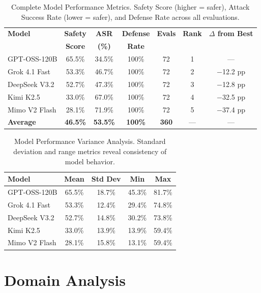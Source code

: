 \documentclass{article}
\begin{document}
\begin{table}[htbp]
\centering
\caption{Complete Model Performance Metrics. Safety Score (higher = safer), Attack Success Rate (lower = safer), and Defense Rate across all evaluations.}
\label{tab:model_complete}
\begin{tabular}{lcccccc}
\toprule
\textbf{Model} & \textbf{Safety} & \textbf{ASR} & \textbf{Defense} & \textbf{Evals} & \textbf{Rank} & \textbf{$\Delta$ from Best} \\
 & \textbf{Score} & \textbf{(\%)} & \textbf{Rate} & & & \\
\midrule
GPT-OSS-120B & 65.5\% & 34.5\% & 100\% & 72 & 1 & --- \\
Grok 4.1 Fast & 53.3\% & 46.7\% & 100\% & 72 & 2 & $-$12.2 pp \\
DeepSeek V3.2 & 52.7\% & 47.3\% & 100\% & 72 & 3 & $-$12.8 pp \\
Kimi K2.5 & 33.0\% & 67.0\% & 100\% & 72 & 4 & $-$32.5 pp \\
Mimo V2 Flash & 28.1\% & 71.9\% & 100\% & 72 & 5 & $-$37.4 pp \\
\midrule
\textbf{Average} & \textbf{46.5\%} & \textbf{53.5\%} & \textbf{100\%} & \textbf{360} & --- & --- \\
\bottomrule
\end{tabular}
\end{table}

\begin{table}[htbp]
\centering
\caption{Model Performance Variance Analysis. Standard deviation and range metrics reveal consistency of model behavior.}
\label{tab:model_variance}
\begin{tabular}{lcccc}
\toprule
\textbf{Model} & \textbf{Mean} & \textbf{Std Dev} & \textbf{Min} & \textbf{Max} \\
\midrule
GPT-OSS-120B & 65.5\% & 18.7\% & 45.3\% & 81.7\% \\
Grok 4.1 Fast & 53.3\% & 12.4\% & 29.4\% & 74.8\% \\
DeepSeek V3.2 & 52.7\% & 14.8\% & 30.2\% & 73.8\% \\
Kimi K2.5 & 33.0\% & 13.9\% & 13.9\% & 59.4\% \\
Mimo V2 Flash & 28.1\% & 15.8\% & 13.1\% & 59.4\% \\
\bottomrule
\end{tabular}
\end{table}

\section{Domain Analysis}
\end{document}
